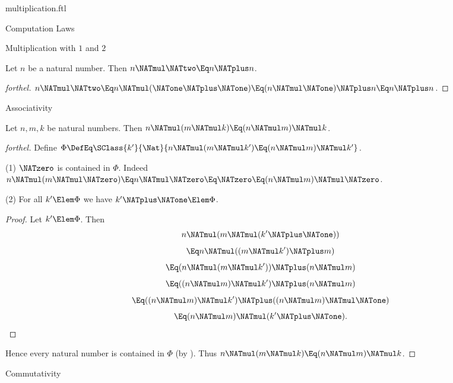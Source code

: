 \documentclass{stex}
\begin{document}
\begin{smodule}{multiplication.ftl}
\begin{sfragment}{Computation Laws}
\begin{sfragment}{Multiplication with $1$ and $2$}
    \begin{corollary}[forthel]
      Let $n$ be a natural number.
      Then $n \NATmul \NATtwo \Eq n \NATplus n$.
    \end{corollary}
    \begin{proof}[forthel]
      $n \NATmul \NATtwo
        \Eq n \NATmul (\NATone \NATplus \NATone)
        \Eq (n \NATmul \NATone) \NATplus n
        \Eq n \NATplus n$.
    \end{proof}
  \end{sfragment}

  \begin{sfragment}{Associativity}
    \begin{proposition}[forthel]
      Let $n, m, k$ be natural numbers.
      Then $n \NATmul (m \NATmul k) \Eq (n \NATmul m) \NATmul k$.
    \end{proposition}
    \begin{proof}[forthel]
      Define $\Phi \DefEq \SClass{k'}{\Nat}{n \NATmul (m \NATmul k') \Eq (n \NATmul m) \NATmul k'}$.

      (1) $\NATzero$ is contained in $\Phi$.
      Indeed $n \NATmul (m \NATmul \NATzero)
        \Eq n \NATmul \NATzero
        \Eq \NATzero
        \Eq (n \NATmul m) \NATmul \NATzero$.

      (2) For all $k' \Elem \Phi$ we have $k' \NATplus \NATone \Elem \Phi$.
      \begin{proof}
        Let $k' \Elem \Phi$.
        Then
        \[  n \NATmul (m \NATmul (k' \NATplus \NATone))                          \]
        \[    \Eq n \NATmul ((m \NATmul k') \NATplus m)                      \]
        \[    \Eq (n \NATmul (m \NATmul k')) \NATplus (n \NATmul m)            \]
        \[    \Eq ((n \NATmul m) \NATmul k') \NATplus (n \NATmul m)            \]
        \[    \Eq ((n \NATmul m) \NATmul k') \NATplus ((n \NATmul m) \NATmul \NATone)  \]
        \[    \Eq (n \NATmul m) \NATmul (k' \NATplus \NATone).                     \]
      \end{proof}

      Hence every natural number is contained in $\Phi$ (by ).
      Thus $n \NATmul (m \NATmul k) \Eq (n \NATmul m) \NATmul k$.
    \end{proof}
  \end{sfragment}

  \begin{sfragment}{Commutativity}



\end{sfragment}
\end{sfragment}
\end{smodule}
\end{document}
